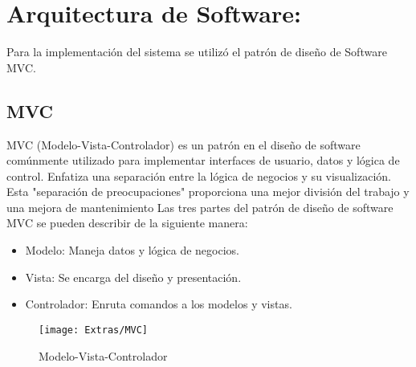 \section{Arquitectura de Software:}
    Para la implementación del sistema se utilizó el patrón de diseño de Software MVC. 
    \subsection{MVC}
    MVC (Modelo-Vista-Controlador) es un patrón en el diseño de software comúnmente utilizado para implementar interfaces de usuario, datos y lógica de control. Enfatiza una separación entre la lógica de negocios y su visualización. Esta "separación de preocupaciones" proporciona una mejor división del trabajo y una mejora de mantenimiento
    Las tres partes del patrón de diseño de software MVC se pueden describir de la siguiente manera:
    \begin{itemize}
        \item Modelo: Maneja datos y lógica de negocios.
        \item Vista: Se encarga del diseño y presentación.
        \item Controlador: Enruta comandos a los modelos y vistas.
    \end{itemize}
    \begin{figure}[H]
		\centering
		\texttt{[image: Extras/MVC]}
		\caption{Modelo-Vista-Controlador}
		\label{fig:MVC}
	\end{figure}

    
